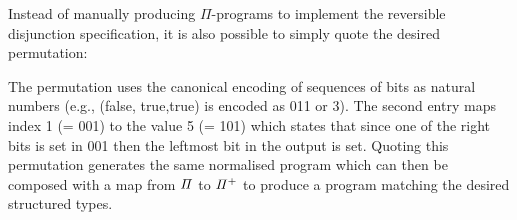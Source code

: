 \medskip
\resetnormtwo{}

Instead of manually producing $\Pi$-programs to implement the reversible disjunction specification, it is also possible
to simply quote the desired permutation:

\medskip
\resetperm{}

\noindent The permutation uses the canonical encoding of sequences of bits as natural numbers (e.g., (\textsf{false},
\textsf{true},\textsf{true}) is encoded as 011 or 3).  The second entry maps index 1 (= 001) to the value 5 (= 101)
which states that since one of the right bits is set in 001 then the leftmost bit in the output is set. Quoting this
permutation generates the same normalised program which can then be composed with a map from $\mathit{\Pi}$ to
$\mathit{{\Pi}^{+}}$ to produce a program matching the desired structured types.






